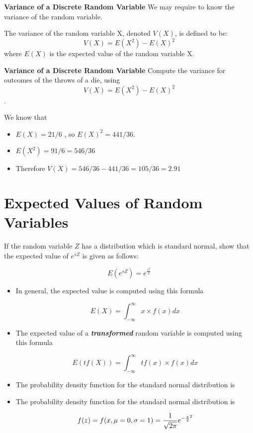 \documentclass[00-IntroStatsMaster.tex]{subfiles}
\begin{document}
	
	
	
	
	
	{
		\textbf{Variance of a Discrete Random Variable}
		We may require to know the variance of the random variable.
		
		The variance of the random variable X, denoted $V(X)$, is defined to be:
		\[ V(X) = E(X^2) - E(X)^2 \]
		where $E(X)$ is the expected value of the random variable X.
	}
	
	
	{
		\textbf{Variance of a Discrete Random Variable}
		Compute the variance for outcomes of the throws of a die, using
		\[ V(X) = E(X^2) - E(X)^2 \].
		
		We know that \begin{itemize} \item $E(X) = 21/6$ , so  $E(X)^2 = 441/36$. \\
			
			\item $E(X^2)  = 91/6  = 546/36$
			
			\item Therefore $V(X) = 546/36 - 441/36 = 105/36 = 2.91$
		\end{itemize}
		
	}	
\section{Expected Values of Random Variables}

If the random variable $Z$ has a distribution which is standard normal, show that the expected value of $e^{sZ}$ is given as follows:

\[E(e^{sZ})  =  e^{\frac{s^2}{2}}\] 


\begin{itemize}
	\item In general, the expected value is computed using this formula
	{
		
		\[ E(X) =  \int_{-\infty}^{\infty}  x \times f(x) dx   \]
	}
	\item The expected value of a \textbf{\textit{transformed}} random variable is computed using this formula
	{
		
		\[ E( tf(X) ) =  \int_{-\infty}^{\infty}  tf(x) \times f(x) dx   \]
	}
	
	\item 
	The probability density function for the standard normal distribution is
	
	
	\item 
	The probability density function for the standard normal distribution is
	
	
	\[f(z) = f(x, \mu= 0, \sigma=1) = \frac{1}{\sqrt{2\pi}} e^{ -{x \over 2}^2 }\]
	
\end{itemize}
\end{document}
